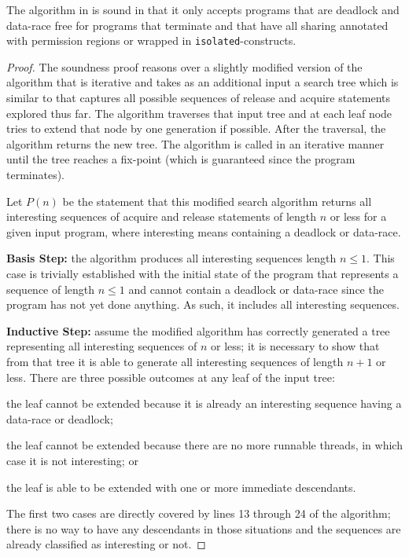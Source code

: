 \begin{theorem}
  The algorithm in  is sound in that it only
  accepts programs that are deadlock and data-race free for programs
  that terminate and that have all sharing annotated with permission
  regions or wrapped in \texttt{isolated}-constructs.
\end{theorem}
\begin{proof}
The soundness proof reasons over a slightly modified version of the
algorithm that is iterative and takes as an additional input
a search tree which is similar to  that
captures all possible sequences of release and acquire statements
explored thus far. The algorithm traverses that input tree and at each
leaf node tries to extend that node by one generation if
possible. After the traversal, the algorithm returns the new tree. The
algorithm is called in an iterative manner until the tree reaches a
fix-point (which is guaranteed since the program terminates).

Let $P(n)$ be the statement that
this modified search algorithm returns all interesting sequences of acquire and release
statements of length $n$ or less for a given input program, where interesting means containing a deadlock or data-race.

\noindent\textbf{Basis Step:} the algorithm produces all interesting
sequences length $n \leq 1$. This case is trivially established with
the initial state of the program that represents a sequence of length
$n \leq 1$ and cannot contain a deadlock or data-race since the program has not yet
done anything. As such, it includes all interesting sequences.

\noindent\textbf{Inductive Step:} assume the modified algorithm has
correctly generated a tree representing all interesting sequences of $n$ or less;
it is necessary to show that from that tree it is able to generate all
interesting sequences of length $n+1$ or less.  There are three possible outcomes at any
leaf of the input tree:
\begin{compactenum}
\item the leaf cannot be extended because it is already an interesting sequence having a data-race or deadlock;
\item the leaf cannot be extended because there are no more runnable threads, in which case it is not interesting; or
\item the leaf is able to be extended with one or more immediate descendants.
\end{compactenum}
The first two cases are directly covered by lines 13 through 24 of the
algorithm; there is no way to have any descendants in those
situations and the sequences are already classified as interesting or not.


\end{proof}
